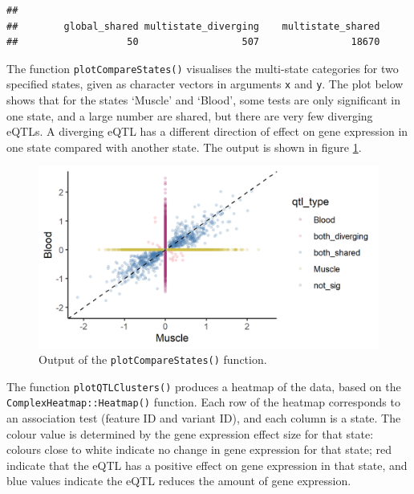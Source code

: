 \documentclass[
]{article}
\newenvironment{Shaded}{\begin{snugshade}}{\end{snugshade}}
\newcommand{\AttributeTok}[1]{\textcolor[rgb]{0.13,0.29,0.53}{#1}}
\newcommand{\FunctionTok}[1]{\textcolor[rgb]{0.13,0.29,0.53}{\textbf{#1}}}
\newcommand{\NormalTok}[1]{#1}
\newcommand{\SpecialCharTok}[1]{\textcolor[rgb]{0.81,0.36,0.00}{\textbf{#1}}}
\newcommand{\StringTok}[1]{\textcolor[rgb]{0.31,0.60,0.02}{#1}}
\begin{document}
\begin{verbatim}
## 
##        global_shared multistate_diverging    multistate_shared 
##                   50                  507                18670
\end{verbatim}

\normalsize

The function \texttt{plotCompareStates()} visualises the multi-state
categories for two specified states, given as character vectors in
arguments \texttt{x} and \texttt{y}. The plot below shows that for the
states `Muscle' and `Blood', some tests are only significant in one
state, and a large number are shared, but there are very few diverging
eQTLs. A diverging eQTL has a different direction of effect on gene
expression in one state compared with another state. The output is shown
in figure \ref{plotCompareStates}. \footnotesize

\begin{Shaded}
\end{Shaded}

\normalsize

\begin{figure}[h] 
\centering
\includegraphics{Figures/plotCompareStates_gtex.png}
\caption{Output of the \texttt{plotCompareStates()} function.}
\label{plotCompareStates}
\end{figure}

The function \texttt{plotQTLClusters()} produces a heatmap of the data,
based on the \texttt{ComplexHeatmap::Heatmap()} function. Each row of
the heatmap corresponds to an association test (feature ID and variant
ID), and each column is a state. The colour value is determined by the
gene expression effect size for that state: colours close to white
indicate no change in gene expression for that state; red indicate that
the eQTL has a positive effect on gene expression in that state, and
blue values indicate the eQTL reduces the amount of gene expression.
\end{document}
